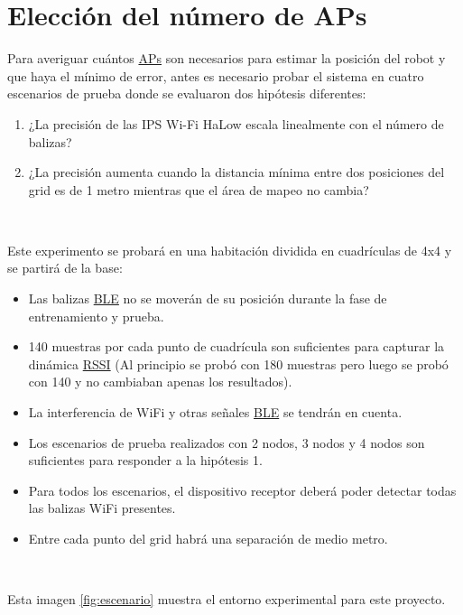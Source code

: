 \section{Elección del número de APs}
\label{sec:num_aps}

Para averiguar cuántos \hyperlink{APs}{APs} son necesarios para estimar la posición del robot y que haya el mínimo de error, antes es necesario probar el sistema en cuatro escenarios de prueba donde se evaluaron dos hipótesis diferentes:

\begin{enumerate}
 \item \textit{} ¿La precisión de las IPS Wi-Fi HaLow escala linealmente con el número de balizas?
 \item \textit{} ¿La precisión aumenta cuando la distancia mínima entre dos posiciones del grid es de 1 metro mientras que el área de mapeo no cambia?
\end{enumerate}\


Este experimento se probará en una habitación dividida en cuadrículas de 4x4 y se partirá de la base:

\begin{itemize}
\item \textit{} Las balizas \hyperlink{BLE}{BLE}  no se moverán de su posición durante la fase de entrenamiento y prueba.
 \item \textit{} 140 muestras por cada punto de cuadrícula son suficientes para capturar la dinámica \hyperlink{RSSI}{RSSI} (Al principio se probó con 180 muestras pero luego se probó con 140 y no cambiaban apenas los resultados).
 \item \textit{} La interferencia de WiFi y otras señales \hyperlink{BLE}{BLE}  se tendrán en cuenta.
 \item \textit{} Los escenarios de prueba realizados con 2 nodos, 3 nodos y 4 nodos son suficientes para responder a la hipótesis 1.
 \item \textit{} Para todos los escenarios, el dispositivo receptor deberá poder detectar todas las balizas WiFi presentes.
 \item \textit{} Entre cada punto del grid habrá una separación de medio metro.
\end{itemize}\


Esta imagen \ref{fig:escenario} muestra el entorno experimental para este proyecto.

